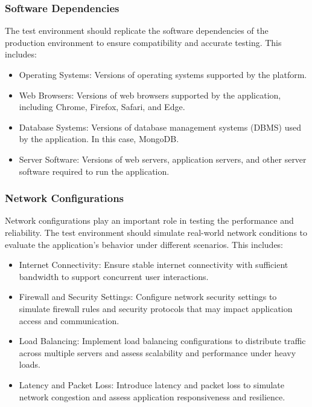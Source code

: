 		\subsubsection{Software Dependencies}
		
		The test environment should replicate the software dependencies of the production environment to ensure compatibility and accurate testing. This includes:
		
		\begin{itemize}
			\item Operating Systems: Versions of operating systems supported by the platform.
			\item Web Browsers: Versions of web browsers supported by the application, including Chrome, Firefox, Safari, and Edge.
			\item Database Systems: Versions of database management systems (DBMS) used by the application. In this case, MongoDB.
			\item Server Software: Versions of web servers, application servers, and other server software required to run the application.
		\end{itemize}
		
		\subsubsection{Network Configurations}
		
		Network configurations play an important role in testing the performance and reliability. The test environment should simulate real-world network conditions to evaluate the application's behavior under different scenarios. This includes:
		
		\begin{itemize}
			\item Internet Connectivity: Ensure stable internet connectivity with sufficient bandwidth to support concurrent user interactions.
			\item Firewall and Security Settings: Configure network security settings to simulate firewall rules and security protocols that may impact application access and communication.
			\item Load Balancing: Implement load balancing configurations to distribute traffic across multiple servers and assess scalability and performance under heavy loads.
			\item Latency and Packet Loss: Introduce latency and packet loss to simulate network congestion and assess application responsiveness and resilience.
		\end{itemize}
		
